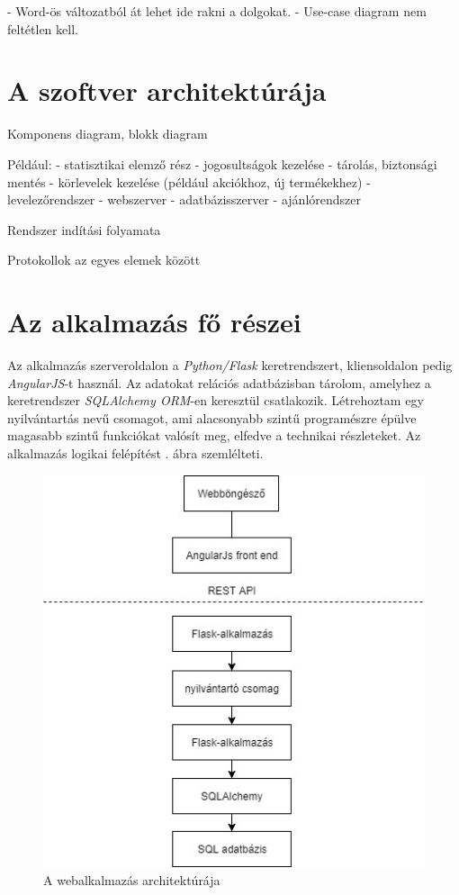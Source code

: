 - Word-ös változatból át lehet ide rakni a dolgokat.
- Use-case diagram nem feltétlen kell.

\section{A szoftver architektúrája}

Komponens diagram, blokk diagram

Például:
- statisztikai elemző rész
- jogosultságok kezelése
- tárolás, biztonsági mentés
- körlevelek kezelése (például akciókhoz, új termékekhez)
- levelezőrendszer
- webszerver
- adatbázisszerver
- ajánlórendszer

Rendszer indítási folyamata

Protokollok az egyes elemek között

\section{Az alkalmazás fő részei}

Az alkalmazás szerveroldalon a \textit{Python/Flask} keretrendszert, kliensoldalon pedig \textit{AngularJS}-t használ. Az adatokat relációs adatbázisban tárolom, amelyhez a keretrendszer \textit{SQLAlchemy ORM}-en keresztül csatlakozik. Létrehoztam egy nyilvántartás nevű csomagot, ami alacsonyabb szintű programészre épülve magasabb szintű funkciókat valósít meg, elfedve a technikai részleteket. Az alkalmazás logikai felépítést . ábra szemlélteti.

\begin{figure}
\centering
\includegraphics[scale=0.8]{kepek/architecture.jpg}
\caption{A webalkalmazás architektúrája}
\label{fig:architecture}
\end{figure}


